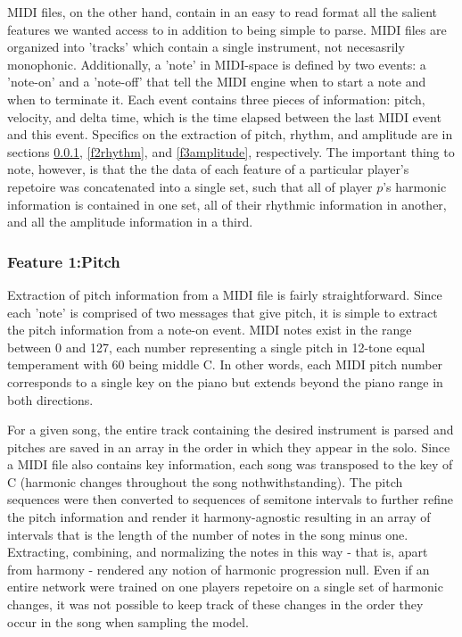 \documentclass[conference]{IEEEtran}
\begin{document}
MIDI files, on the other hand, contain in an easy to read format all the salient features we wanted access to in addition to being simple to parse. MIDI files are organized into 'tracks' which contain a single instrument, not necesasrily monophonic. Additionally, a 'note' in MIDI-space is defined by two events: a 'note-on' and a 'note-off' that tell the MIDI engine when to start a note and when to terminate it. Each event contains three pieces of information: pitch, velocity, and delta time, which is the time elapsed between the last MIDI event and this event. Specifics on the extraction of pitch, rhythm, and amplitude are in sections \ref{f1pitch}, \ref{f2rhythm}, and \ref{f3amplitude}, respectively. The important thing to note, however, is that the the data of each feature of a particular player's repetoire was concatenated into a single set, such that all of player $p$'s harmonic information is contained in one set, all of their rhythmic information in another, and all the amplitude information in a third.

\subsubsection{Feature 1:Pitch} \label{f1pitch}
Extraction of pitch information from a MIDI file is fairly straightforward. Since each 'note' is comprised of two messages that give pitch, it is simple to extract the pitch information from a note-on event. MIDI notes exist in the range between 0 and 127, each number representing a single pitch in 12-tone equal temperament with 60 being middle C. In other words, each MIDI pitch number corresponds to a single key on the piano but extends beyond the piano range in both directions.

For a given song, the entire track containing the desired instrument is parsed and pitches are saved in an array in the order in which they appear in the solo. Since a MIDI file also contains key information, each song was transposed to the key of C (harmonic changes throughout the song nothwithstanding). The pitch sequences were then converted to sequences of semitone intervals to further refine the pitch information and render it harmony-agnostic resulting in an array of intervals that is the length of the number of notes in the song minus one. Extracting, combining, and normalizing the notes in this way - that is, apart from harmony - rendered any notion of harmonic progression null. Even if an entire network were trained on one players repetoire on a single set of harmonic changes, it was not possible to keep track of these changes in the order they occur in the song when sampling the model.
\end{document}
